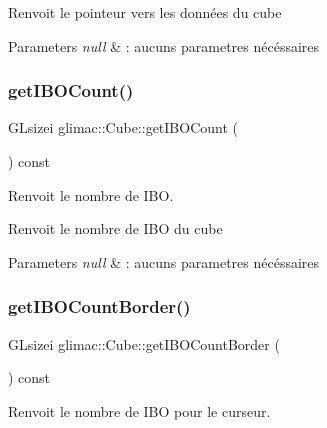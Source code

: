 Renvoit le pointeur vers les données du cube


\begin{DoxyParams}{Parameters}
{\em null} & \+: aucuns parametres nécéssaires \\
\hline
\end{DoxyParams}
\mbox{\label{classglimac_1_1Cube_a15f4c706a6958d1e06479c0c1a743b8c}} 
\subsubsection{\texorpdfstring{get\+I\+B\+O\+Count()}{getIBOCount()}}
{\footnotesize\ttfamily G\+Lsizei glimac\+::\+Cube\+::get\+I\+B\+O\+Count (\begin{DoxyParamCaption}{ }\end{DoxyParamCaption}) const\hspace{0.3cm}{\ttfamily [inline]}}



Renvoit le nombre de I\+BO. 

Renvoit le nombre de I\+BO du cube


\begin{DoxyParams}{Parameters}
{\em null} & \+: aucuns parametres nécéssaires \\
\hline
\end{DoxyParams}
\mbox{\label{classglimac_1_1Cube_af5e5d77fd2bd354383d7b448234d5286}} 
\subsubsection{\texorpdfstring{get\+I\+B\+O\+Count\+Border()}{getIBOCountBorder()}}
{\footnotesize\ttfamily G\+Lsizei glimac\+::\+Cube\+::get\+I\+B\+O\+Count\+Border (\begin{DoxyParamCaption}{ }\end{DoxyParamCaption}) const\hspace{0.3cm}{\ttfamily [inline]}}



Renvoit le nombre de I\+BO pour le curseur. 

